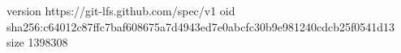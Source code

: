 version https://git-lfs.github.com/spec/v1
oid sha256:c64012c87ffc7baf608675a7d4943ed7e0abcfc30b9e981240cdcb25f0541d13
size 1398308
